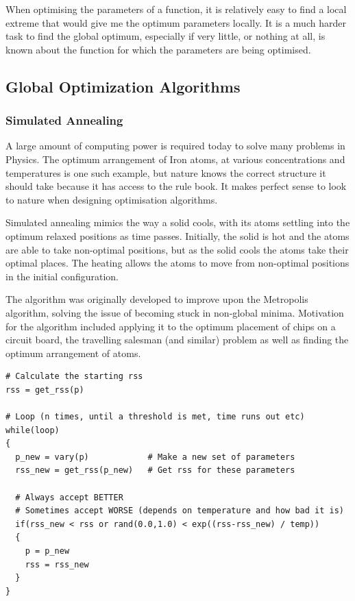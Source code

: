 When optimising the parameters of a function, it is relatively easy to find a local extreme that would give me the optimum parameters locally.  It is a much harder task to find the global optimum, especially if very little, or nothing at all, is known about the function for which the parameters are being optimised.



\subsection{Global Optimization Algorithms}


\subsubsection{Simulated Annealing}

A large amount of computing power is required today to solve many problems in Physics.  The optimum arrangement of Iron atoms, at various concentrations and temperatures is one such example, but nature knows the correct structure it should take because it has access to the rule book.  It makes perfect sense to look to nature when designing optimisation algorithms.

Simulated annealing mimics the way a solid cools, with its atoms settling into the optimum relaxed positions as time passes.  Initially, the solid is hot and the atoms are able to take non-optimal positions, but as the solid cools the atoms take their optimal places.  The heating allows the atoms to move from non-optimal positions in the initial configuration.

The algorithm was originally developed to improve upon the Metropolis algorithm, solving the issue of becoming stuck in non-global minima.  Motivation for the algorithm included applying it to the optimum placement of chips on a circuit board\cite{simanneal}, the travelling salesman (and similar) problem as well as finding the optimum arrangement of atoms.


\begin{lstlisting}[style=sPseudo,caption={Pseudocode for the simulated annealing algorithm},label={listing:simulatedannealing}]
# Calculate the starting rss
rss = get_rss(p)

# Loop (n times, until a threshold is met, time runs out etc)
while(loop)
{  
  p_new = vary(p)            # Make a new set of parameters
  rss_new = get_rss(p_new)   # Get rss for these parameters

  # Always accept BETTER
  # Sometimes accept WORSE (depends on temperature and how bad it is)
  if(rss_new < rss or rand(0.0,1.0) < exp((rss-rss_new) / temp))
  {
    p = p_new
    rss = rss_new
  }
}    
\end{lstlisting}


